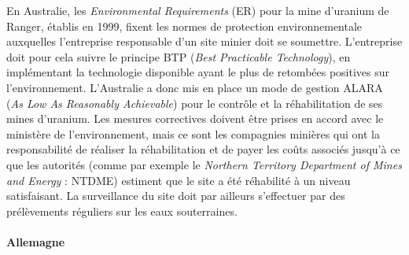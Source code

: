 \documentclass{article}
\begin{document}
En Australie, les \textit{Environmental Requirements} (ER) pour la mine d’uranium de Ranger, établis en 1999, fixent les normes de protection environnementale auxquelles l’entreprise responsable d’un site minier doit se soumettre.
L’entreprise doit pour cela suivre le principe BTP (\textit{Best Practicable Technology}), en implémentant la technologie disponible ayant le plus de retombées positives sur l’environnement. L’Australie a donc mis en place un mode de gestion ALARA (\textit{As Low As Reasonably Achievable}) pour le contrôle et la réhabilitation de ses mines d’uranium.
Les mesures correctives doivent être prises en accord avec le ministère de l’environnement, mais ce sont les compagnies minières qui ont la responsabilité de réaliser la réhabilitation et de payer les coûts associés jusqu’à ce que les autorités (comme par exemple le \textit{Northern Territory Department of Mines and Energy} : NTDME) estiment que le site a été réhabilité à un niveau satisfaisant. La surveillance du site doit par ailleurs s’effectuer par des prélèvements réguliers sur les eaux souterraines.

\paragraph{Allemagne \\ \\}
\end{document}
